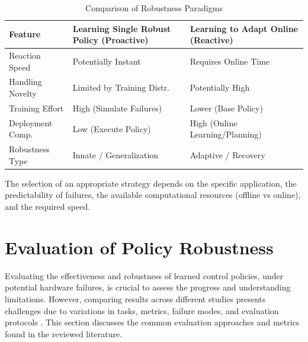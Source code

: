 \documentclass[12pt, a4paper]{article} %
\begin{document}
\begin{table}[h]
 \centering
 \caption{Comparison of Robustness Paradigms}
 \begin{tabular}{l|p{5cm}|p{5cm}}
 \hline
 \textbf{Feature} & \textbf{Learning Single Robust Policy (Proactive)} & \textbf{Learning to Adapt Online (Reactive)} \\
 \hline \hline \vspace{0.2cm}
 Reaction Speed & Potentially Instant & Requires Online Time \\
 \vspace{0.2cm}
 Handling Novelty & Limited by Training Distr. & Potentially High \\
 \vspace{0.2cm}
 Training Effort & High (Simulate Failures) & Lower (Base Policy) \\
 \vspace{0.2cm}
 Deployment Comp. & Low (Execute Policy) & High (Online Learning/Planning) \\
 \vspace{0.2cm} %
 Robustness Type & Innate / Generalization & Adaptive / Recovery \\
 \hline
 \end{tabular}
 \label{tab:paradigm_comparison}
\end{table}
\noindent %
The selection of an appropriate strategy depends on the specific application, the predictability of failures, the available computational resources (offline vs online), and the required speed.

\section{Evaluation of Policy Robustness}
\label{sec:evaluation} %

Evaluating the effectiveness and robustness of learned control policies, under potential hardware failures, is crucial to assess the progress and understanding limitations. However, comparing results across different studies presents challenges due to variations in tasks, metrics, failure modes, and evaluation protocols \citep{glossop2022characterising}. This section discusses the common evaluation approaches and metrics found in the reviewed literature.
\end{document}
